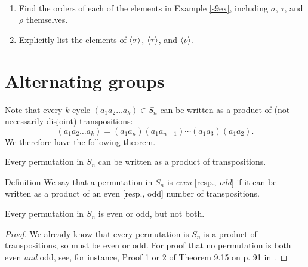 

\begin{example}{}\
\begin{enumerate}
 \item Find the orders of each of the elements in Example \ref{s9ex}, including $\sigma$, $\tau$, and $\rho$ themselves.
 \item Explicitly list the elements of $\langle\sigma\rangle$, $\langle\tau\rangle$, and $\langle\rho\rangle$.  \end{enumerate}
\end{example}

\section{Alternating groups}

Note that every $k$-cycle $(a_1a_2\ldots a_k)\in S_n$ can be written as a product of (not necessarily disjoint) transpositions:
$$(a_1a_2\ldots a_k)=(a_1a_n)(a_1a_{n-1})\cdots(a_1a_3)(a_1a_2).$$  We therefore have the following theorem.

\begin{thm}\label{} Every permutation in $S_n$ can be written as a product of transpositions.\end{thm}

\begin{df}{Definition} We say that a permutation in $S_n$ is \textit{even} [resp., \textit{odd}] if it can be written as a product of an even [resp., odd] number of transpositions. \end{df}

\begin{thm}\label{}
Every permutation in $S_n$ is even or odd, but not both.
\end{thm}

\begin{proof} We already know that every permutation is $S_n$ is a product of transpositions, so must be even or odd.  For proof that no permutation is both even \textit{and} odd, see, for instance, Proof 1 or 2 of Theorem 9.15 on p. 91 in \cite{F}.\end{proof}


